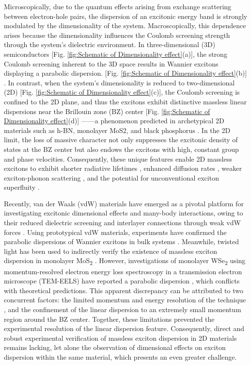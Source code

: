 \documentclass[twocolumn,prl,showpacs,superscriptaddress,longbibliography]{revtex4-2}
\begin{document}
Microscopically, due to the quantum effects arising from exchange
scattering between electron-hole pairs, the dispersion of an excitonic
energy band is strongly modulated by the dimensionality of the system.
Macroscopically, this dependence arises because the dimensionality
influences the Coulomb screening strength through the system's dielectric
environment. In three-dimensional (3D) semiconductors {[}Fig. \ref{fig:Schematic of Dimensionality effect}(a){]},
the strong Coulomb screening inherent to the 3D space results in Wannier
excitons displaying a parabolic dispersion. {[}Fig. \ref{fig:Schematic of Dimensionality effect}(b){]}
\citep{RN221,RN587}. In contrast, when the system's dimensionality
is reduced to two-dimensional (2D) {[}Fig. \ref{fig:Schematic of Dimensionality effect}(c){]},
the Coulomb screening is confined to the 2D plane, and thus the excitons
exhibit distinctive massless linear dispersions near the Brillouin
zone (BZ) center {[}Fig. \ref{fig:Schematic of Dimensionality effect}(d){]}
------a phenomenon predicted in archetypical 2D materials such as
h-BN, monolayer MoS2, and black phosphorus \citep{RN567,RN238,RN221,RN596,RN576}.
In the 2D limit, the loss of massive character not only suppresses
the excitonic density of states at the BZ center but also endows the
excitons with high, constant group and phase velocities. Consequently,
these unique features enable 2D massless excitons to exhibit shorter
radiative lifetimes \citep{RN221,RN617}, enhanced diffusion rates
\citep{RN221,RN595}, weaker exciton-phonon scattering \citep{RN595},
and the potential for unconventional exciton superfluity \citep{RN597}.

Recently, van der Waals (vdW) materials have emerged as a pivotal
platform for investigating excitonic dimensional effects and many-body
interactions, owing to their reduced dielectric screening and interlayer
connections through weak vdW forces \citep{RN228,RN605,RN216}. Using
prototypical vdW materials, experiments have confirmed the parabolic
dispersions of Wannier excitons in bulk systems \citep{RN620,RN214,RN607}.
Meanwhile, twisted light has been used to indirectly verify the existence
of massless exciton dispersion in monolayer MoS\textsubscript{2}
\citep{RN598}. However, investigations of monolayer WSe\textsubscript{2}
using momentum-resolved electron energy loss spectroscopy in a transmission
electron microscope (TEM-EELS) have reported a parabolic dispersion
\citep{RN217}, which conflicts with theoretical predictions. This
apparent discrepancy can be attributed to two concurrent factors:
the limited momentum and energy resolution of the technique \citep{RN648},
and the confinement of the linear dispersion to an extremely small
momentum region around the BZ center. Together, these limitations
prevented the experimental resolution of the linear dispersion feature.
Consequently, direct and robust experimental verification of massless
exciton dispersion in 2D materials remains lacking, let alone the
observation of dimensional effects on exciton dispersion within the
same material, which presents an even greater challenge.
\end{document}
